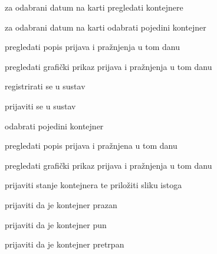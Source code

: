 \begin{packed_enum}
\begin{packed_enum}
\begin{packed_enum}
					\end {packed_enum}	
				
					
					\item za odabrani datum na karti pregledati kontejnere 
					\item za odabrani datum na karti odabrati pojedini kontejner
					\begin{packed_enum}
						
						\item  pregledati popis prijava i pražnjenja u tom danu
						\item  pregledati grafički prikaz prijava i pražnjenja u tom danu
				
					\end {packed_enum}	
				
				\end {packed_enum}	
			
				\item  {}
				
				\begin{packed_enum}
					
					\item registrirati se u sustav
					\item prijaviti se u sustav
					\item odabrati pojedini kontejner
					\begin{packed_enum}
						
						\item  pregledati popis prijava i pražnjena u tom danu
						\item  pregledati grafički prikaz prijava i pražnjenja u tom danu
				
					\end{packed_enum}
					
					\item prijaviti stanje kontejnera te priložiti sliku istoga
					\begin{packed_enum}
					
						\item prijaviti da je kontejner prazan
						\item prijaviti da je kontejner pun
						\item prijaviti da je kontejner pretrpan
						
					\end {packed_enum}	
					
						
				\end{packed_enum}
					
		\item  {}
				

\end{packed_enum}
